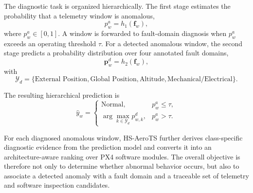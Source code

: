The diagnostic task is organized hierarchically. The first stage estimates the probability that a telemetry window is anomalous,
\begin{equation}
p^{a}_{w}=h_{1}(\mathbf{f}_{w}),
\label{eq:anomaly_probability}
\end{equation}
where $p^{a}_{w}\in[0,1]$. A window is forwarded to fault-domain diagnosis when $p^{a}_{w}$ exceeds an operating threshold $\tau$. For a detected anomalous window, the second stage predicts a probability distribution over four annotated fault domains,
\begin{equation}
\mathbf{p}^{d}_{w}=h_{2}(\mathbf{f}_{w}),
\label{eq:fault_domain_probability}
\end{equation}
with
\begin{equation}
\mathcal{Y}_{d}
=
\{
\text{External Position},
\text{Global Position},
\text{Altitude},
\text{Mechanical/Electrical}
\}.
\label{eq:fault_domain_label_space}
\end{equation}

The resulting hierarchical prediction is
\begin{equation}
\hat{y}_{w}
=
\begin{cases}
\text{Normal}, & p^{a}_{w} \leq \tau,\\[4pt]
\displaystyle \arg\max_{k\in\mathcal{Y}_{d}} p^{d}_{w,k},
& p^{a}_{w} > \tau.
\end{cases}
\label{eq:problem_cascade}
\end{equation}

For each diagnosed anomalous window, HS-AeroTS further derives class-specific diagnostic evidence from the prediction model and converts it into an architecture-aware ranking over PX4 software modules. The overall objective is therefore not only to determine whether abnormal behavior occurs, but also to associate a detected anomaly with a fault domain and a traceable set of telemetry and software inspection candidates.
